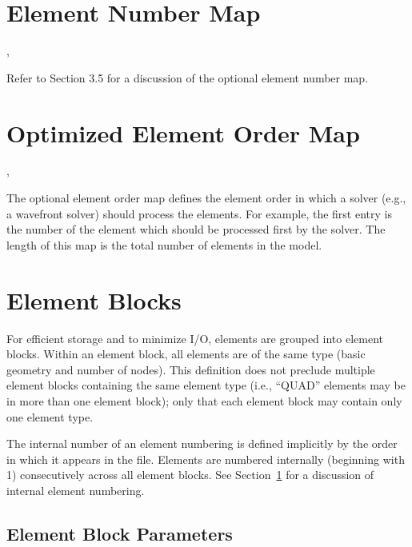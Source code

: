 \section{Element Number Map}\label{s:enm}

\begin{spacing}{1.5}
\api {}, 


\end{spacing}

{Refer to  Section 3.5 for a discussion of the optional element
number map.}




\section{Optimized Element Order Map}\label{s:eom}

\begin{spacing}{1.5}
\api {}, 


\end{spacing}

The optional element order map defines the element order in which a
solver (e.g., a wavefront solver) should process the elements. For
example, the first entry is the number of the element which should be
processed first by the solver. The length of this map is the total
number of elements in the model.

\section{Element Blocks}

For efficient storage and to minimize I/O, elements are grouped into
element blocks. Within an element block, all elements are of the same
type (basic geometry and number of nodes). This definition does not
preclude multiple element blocks containing the same element type
(i.e., ``QUAD'' elements may be in more than one element block); only
that each element block may contain only one element type.

The internal number of an element numbering is defined implicitly by
the order in which it appears in the file. Elements are numbered
internally (beginning with 1) consecutively across all element
blocks. See Section~\ref{s:enm} for a discussion of internal element
numbering.

\subsection{Element Block Parameters}\label{s:ebp}

